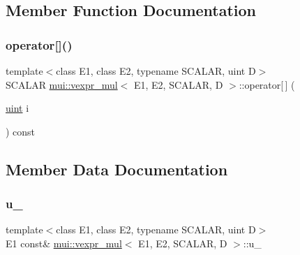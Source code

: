 \subsection{Member Function Documentation}
\mbox{\label{structmui_1_1vexpr__mul_ab1b369afda3cc584f638a5d471a3a775}} 
\subsubsection{\texorpdfstring{operator[]()}{operator[]()}}
{\footnotesize\ttfamily template$<$class E1, class E2, typename S\+C\+A\+L\+AR, uint D$>$ \\
S\+C\+A\+L\+AR \hyperlink{structmui_1_1vexpr__mul}{mui\+::vexpr\+\_\+mul}$<$ E1, E2, S\+C\+A\+L\+AR, D $>$\+::operator\mbox{[}$\,$\mbox{]} (\begin{DoxyParamCaption}\item[{\hyperlink{namespacemui_af15a3e7188a2117fb9965277bb0cacd2}{uint}}]{i }\end{DoxyParamCaption}) const\hspace{0.3cm}{\ttfamily [inline]}}



\subsection{Member Data Documentation}
\mbox{\label{structmui_1_1vexpr__mul_a0b0d2b236c8fff955b60ba5354d46d07}} 
\subsubsection{\texorpdfstring{u\+\_\+}{u\_}}
{\footnotesize\ttfamily template$<$class E1, class E2, typename S\+C\+A\+L\+AR, uint D$>$ \\
E1 const\& \hyperlink{structmui_1_1vexpr__mul}{mui\+::vexpr\+\_\+mul}$<$ E1, E2, S\+C\+A\+L\+AR, D $>$\+::u\+\_\+\hspace{0.3cm}{\ttfamily [protected]}}

\mbox{\label{structmui_1_1vexpr__mul_a1c6611c857bcd820d105c66884eb5bea}} 
